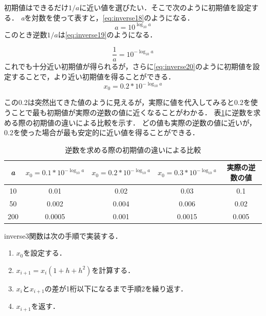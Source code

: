 \documentclass[a4paper,11pt,dvipdfmx]{jsarticle}
\begin{document}
初期値はできるだけ$1 / a$に近い値を選びたい．そこで次のように初期値を設定する．
\textit{a}を対数を使って表すと，\eqref{eq:inverse18}のようになる．
\begin{equation}
    a = 10^{\log_{10} a}
    \label{eq:inverse18}
\end{equation}
このとき逆数$1 / a$は\eqref{eq:inverse19}のようになる．

\begin{equation}
    \frac{1}{a} = 10^{-\log_{10} a}
    \label{eq:inverse19}
\end{equation}
これでも十分近い初期値が得られるが，さらに\eqref{eq:inverse20}のように初期値を設定することで，より近い初期値を得ることができる．
\begin{equation}
    x_0 = 0.2 * 10^{-\log_{10} a}
    \label{eq:inverse20}
\end{equation}

この0.2は突然出てきた値のように見えるが，実際に値を代入してみると0.2を使うことで最も初期値が実際の逆数の値に近くなることがわかる．
表\ref{table:inverse3}に逆数を求める際の初期値の違いによる比較を示す．
どの値も実際の逆数の値に近いが，0.2を使った場合が最も安定的に近い値を得ることができる．

\begin{table}[H]
\centering
\caption{逆数を求める際の初期値の違いによる比較}
\label{table:inverse3}
\begin{tabular}{c|c|c|c|c}
\hline
\textit{a} & $x_0 = 0.1 * 10^{-\log_{10} a}$ & $x_0 = 0.2 * 10^{-\log_{10} a}$ & $x_0 = 0.3 * 10^{-\log_{10} a}$ & 実際の逆数の値\\
\hline
\hline
10 & 0.01 & 0.02 & 0.03 & 0.1 \\
50 & 0.002 & 0.004 & 0.006 & 0.02 \\
200 & 0.0005 & 0.001 & 0.0015 & 0.005 \\
\hline
\end{tabular}
\end{table}


inverse3関数は次の手順で実装する．

\begin{enumerate}
    \item $x_0$を設定する．
    \item $x_{i+1} = x_i(1 + h + h^2)$を計算する．
    \item $x_i$と$x_{i+1}$の差が1桁以下になるまで手順2を繰り返す．
    \item $x_{i+1}$を返す．
\end{enumerate}
\end{document}
